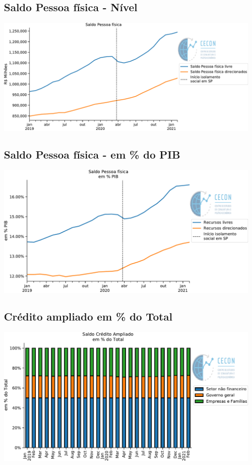 \documentclass{SelfArx}
\begin{document}
\subsection*{Saldo Pessoa física - Nível}
\label{sec:org4199b4d}

\begin{center}
\includegraphics[width=.9\linewidth]{./figs/Credito/SaldoPF.pdf}
\end{center}


\subsection*{Saldo Pessoa física - em \% do PIB}
\label{sec:orgf48616c}

\begin{center}
\includegraphics[width=.9\linewidth]{./figs/Credito/SaldoPF_PIB.pdf}
\end{center}


\subsection*{Crédito ampliado em \% do Total}
\label{sec:orgdf1d844}

\begin{center}
\includegraphics[width=.9\linewidth]{./figs/Credito/SaldoCreditoAmpliado_Total.pdf}
\end{center}
\end{document}
